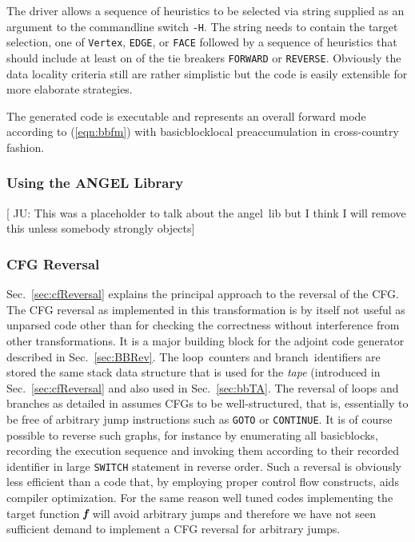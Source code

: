 \documentclass{book}
\newcommand{\angel}{angel}
\newcommand{\Loop}{loop}
\newcommand{\branch}{branch}
\newcommand{\basicblock}{basicblock}
\newcommand{\bmf}{\mbox{\bf\em f}}
\newcommand{\refsec}[1]{{Sec.~\ref{#1}}}
\newcommand{\refeqn}[1]{{(\ref{#1})}}
\begin{document}
The driver allows a sequence of heuristics to be selected via string supplied as 
an argument to the commandline switch \lstinline{-H}. The string needs to contain 
the target selection, one of \lstinline{Vertex}, \lstinline{EDGE}, or \lstinline{FACE} followed by 
a sequence of heuristics that should include at least on of the tie breakers \lstinline{FORWARD} or 
\lstinline{REVERSE}. 
Obviously the data locality criteria still are rather simplistic but 
the code is easily extensible for more elaborate strategies. 

The generated code is executable and represents an overall forward mode 
according to \refeqn{eqn:bbfm} with \basicblock\-local preaccumulation in 
cross-country fashion. 

\subsubsection{Using the ANGEL Library}\label{sec:angel}
{\color{red} [ JU: This was a placeholder to talk about the \angel\ lib 
  but I think I will remove this unless somebody strongly objects]}
\subsubsection{CFG Reversal}\label{sec:cfgRevAlg}

\refsec{sec:cfReversal} explains the principal approach to the reversal 
of the CFG. The CFG reversal as implemented in this transformation is 
by itself not useful as unparsed code other than for checking the correctness without 
interference from other transformations. It is a major building block for 
the  
adjoint code generator described in \refsec{sec:BBRev}. 
The \Loop\ counters and \branch\ identifiers are stored the same 
stack data structure that is used for the {\em tape} (introduced in 
\refsec{sec:cfReversal} and also used in \refsec{sec:bbTA}.  
The reversal of loops and branches as detailed in \cite{NULF04CFR} assumes 
CFGs to be well-structured, that is, essentially to be free of arbitrary jump instructions 
such as \lstinline{GOTO} or \lstinline{CONTINUE}. 
It is of course possible to reverse such graphs, for instance by enumerating
all {\basicblock}s, recording the execution sequence and invoking them according 
to their recorded identifier in  large  \lstinline {SWITCH} statement in reverse order.
Such a reversal is obviously less efficient than a code that, by employing proper 
control flow constructs, aids compiler optimization. 
For the same reason well tuned codes implementing the target function $\bmf$ will 
avoid arbitrary jumps and therefore we have not seen sufficient demand to implement 
a CFG reversal for arbitrary jumps. 
\end{document}
